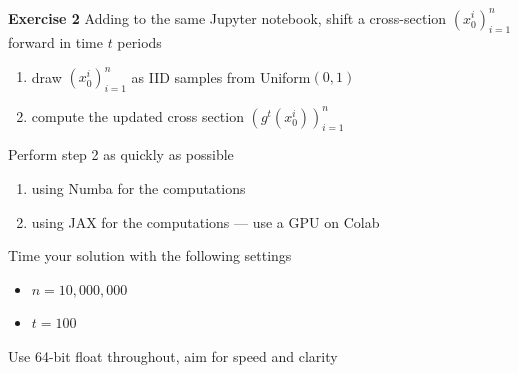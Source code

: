 \documentclass[xcolor=dvipsnames]{beamer}
\begin{document}
\begin{frame}
    
    {\bf Exercise 2} Adding to the same Jupyter notebook, shift a cross-section $(x_0^i)_{i=1}^n$
    forward in time $t$ periods

    \begin{enumerate}
        \item draw $(x_0^i)_{i=1}^n$ as IID samples from Uniform$(0,1)$
        \item compute the updated cross section $(g^t(x_0^i))_{i=1}^n$
    \end{enumerate}

    Perform step 2 as quickly as possible 
    \begin{enumerate}
        \item using Numba for the computations
        \item using JAX for the computations --- use a GPU on Colab
    \end{enumerate}

    Time your solution with the following settings

    \begin{itemize}
        \item $n = 10,000,000$
        \item $t = 100$
    \end{itemize}

    Use 64-bit float throughout, aim for speed and clarity

\end{frame}
\end{document}
